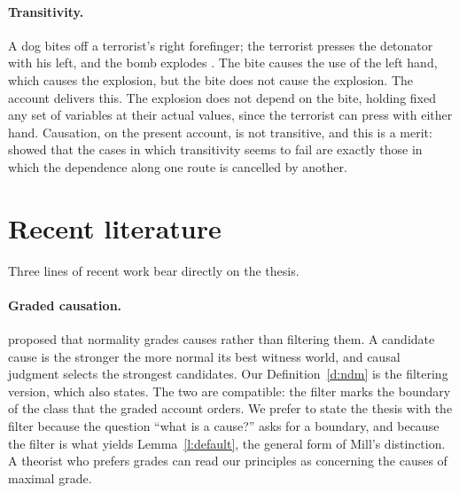 \documentclass{situationist-preprint}
\begin{document}
\paragraph{Transitivity.} A dog bites off a terrorist's right forefinger; the terrorist presses the detonator with his left, and the bomb explodes \citep{McDermott1995}. The bite causes the use of the left hand, which causes the explosion, but the bite does not cause the explosion. The account delivers this. The explosion does not depend on the bite, holding fixed any set of variables at their actual values, since the terrorist can press with either hand. Causation, on the present account, is not transitive, and this is a merit: \citet{Hitchcock2001} showed that the cases in which transitivity seems to fail are exactly those in which the dependence along one route is cancelled by another.

\section{Recent literature}\label{s:recent}

Three lines of recent work bear directly on the thesis.

\paragraph{Graded causation.} \citet{HalpernHitchcock2015} proposed that normality grades causes rather than filtering them. A candidate cause is the stronger the more normal its best witness world, and causal judgment selects the strongest candidates. Our Definition~\ref{d:ndm} is the filtering version, which \citet[\S 3.2]{Halpern2016} also states. The two are compatible: the filter marks the boundary of the class that the graded account orders. We prefer to state the thesis with the filter because the question \enquote{what is a cause?} asks for a boundary, and because the filter is what yields Lemma~\ref{l:default}, the general form of Mill's distinction. A theorist who prefers grades can read our principles as concerning the causes of maximal grade.
\end{document}
